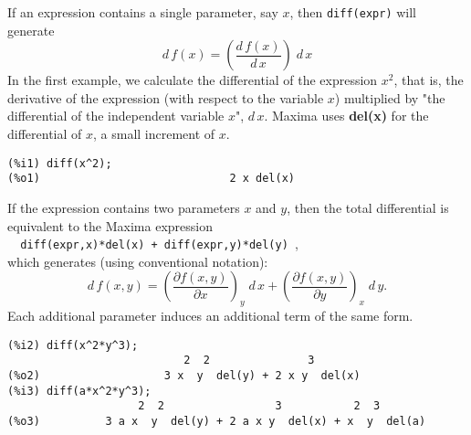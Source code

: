 \documentclass[12pt]{article}
\begin{document}
  \smallskip
If an expression contains a single parameter, say $x$, then \verb|diff(expr)| will
  generate
\begin{equation}
d\,f(x) = \left(\frac{d\, f(x)}{d\, x}  \right) \; d\,x
\end{equation}  
\smallskip
In the first example, we calculate the differential of the expression $x^2$, that is,
 the derivative of the expression (with respect to the variable $x$)
  multiplied by "the differential of the independent variable $x$", $d\,x$.
Maxima uses \textbf{del(x)} for the differential of $x$, a small increment of $x$.  
\small
\begin{verbatim}
(%i1) diff(x^2);
(%o1)                             2 x del(x)
\end{verbatim}
\normalsize
If the expression contains two parameters $x$ and $y$, then the total 
  differential is equivalent to the Maxima expression\\
\verb|  diff(expr,x)*del(x) + diff(expr,y)*del(y) |, \\
which generates (using conventional notation):
\begin{equation}
 d\,f(x,y) = \left(\frac{\partial f(x,y)}{\partial x}  \right)_{y} \; d\,x  +
    \left(\frac{\partial f(x,y)}{\partial y}  \right)_{x} \; d\,y.
\end{equation}  
Each additional parameter induces an additional term of the same form.  
\small
\begin{verbatim}
(%i2) diff(x^2*y^3);
                           2  2               3
(%o2)                   3 x  y  del(y) + 2 x y  del(x)
(%i3) diff(a*x^2*y^3);
                    2  2                 3           2  3
(%o3)          3 a x  y  del(y) + 2 a x y  del(x) + x  y  del(a)
\end{verbatim}
\normalsize
\end{document}
